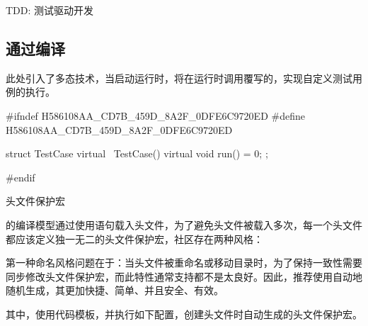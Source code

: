 \begin{content}
\begin{episode}{TDD: 测试驱动开发}
\begin{content}
\end{content}

\end{episode}

\subsection{通过编译}

此处引入了多态技术，当启动运行时，将在运行时调用覆写的，实现自定义测试用例的执行。

\begin{leftbar}
 \begin{c++}[caption={\ttfamily{include/mars/core/TestCase.h}}]
#ifndef H586108AA_CD7B_459D_8A2F_0DFE6C9720ED
#define H586108AA_CD7B_459D_8A2F_0DFE6C9720ED

struct TestCase {
  virtual ~TestCase() {}
  virtual void run() = 0;
};

#endif
  \end{c++}
\end{leftbar}


\begin{episode}{头文件保护宏}

\begin{content}

的编译模型通过使用语句载入头文件，为了避免头文件被载入多次，每一个头文件都应该定义独一无二的头文件保护宏，社区存在两种风格：

\begin{enum}
\end{enum}

第一种命名风格问题在于：当头文件被重命名或移动目录时，为了保持一致性需要同步修改头文件保护宏，而此特性通常支持都不是太良好。因此，推荐使用自动地随机生成，其更加快捷、简单、并且安全、有效。

其中，使用代码模板，并执行如下配置，创建头文件时自动生成的头文件保护宏。

\begin{leftbar}
\end{leftbar}


\end{content}
\end{episode}
\end{content}
